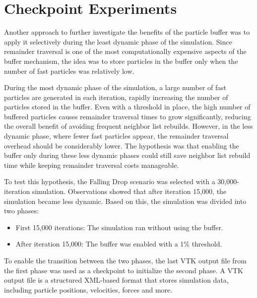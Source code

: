 

\section{Checkpoint Experiments}


Another approach to further investigate the benefits of the particle buffer was to apply it selectively during the least dynamic phase of the simulation. Since remainder traversal is one of the most computationally expensive aspects of the buffer mechanism, the idea was to store particles in the buffer only when the number of fast particles was relatively low.

During the most dynamic phase of the simulation, a large number of fast particles are generated in each iteration, rapidly increasing the number of particles stored in the buffer. Even with a threshold in place, the high number of buffered particles causes remainder traversal times to grow significantly, reducing the overall benefit of avoiding frequent neighbor list rebuilds. However, in the less dynamic phase, where fewer fast particles appear, the remainder traversal overhead should be considerably lower. The hypothesis was that enabling the buffer only during these less dynamic phases could still save neighbor list rebuild time while keeping remainder traversal costs manageable.


To test this hypothesis, the Falling Drop scenario was selected with a 30,000-iteration simulation. Observations showed that after iteration 15,000, the simulation became less dynamic. Based on this, the simulation was divided into two phases:

\begin{itemize}
    \item First 15,000 iterations: The simulation ran without using the buffer.
    \item After iteration 15,000: The buffer was enabled with a 1\% threshold.
\end{itemize}

To enable the transition between the two phases, the last VTK output file from the first phase was used as a checkpoint to initialize the second phase. A VTK output file is a structured XML-based format that stores simulation data, including particle positions, velocities, forces and more.

